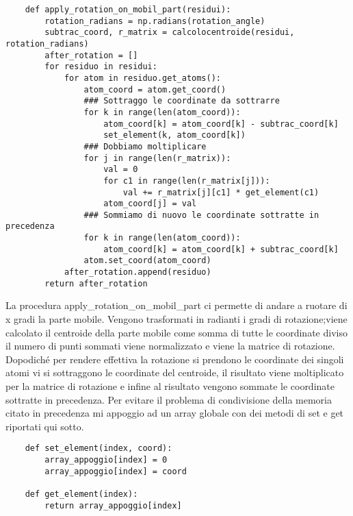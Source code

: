 \begin{verbatim}
    def apply_rotation_on_mobil_part(residui):
        rotation_radians = np.radians(rotation_angle)
        subtrac_coord, r_matrix = calcolocentroide(residui, rotation_radians)
        after_rotation = []
        for residuo in residui:
            for atom in residuo.get_atoms():
                atom_coord = atom.get_coord()
                ### Sottraggo le coordinate da sottrarre
                for k in range(len(atom_coord)):
                    atom_coord[k] = atom_coord[k] - subtrac_coord[k]
                    set_element(k, atom_coord[k])
                ### Dobbiamo moltiplicare
                for j in range(len(r_matrix)):
                    val = 0
                    for c1 in range(len(r_matrix[j])):
                        val += r_matrix[j][c1] * get_element(c1)
                    atom_coord[j] = val
                ### Sommiamo di nuovo le coordinate sottratte in precedenza
                for k in range(len(atom_coord)):
                    atom_coord[k] = atom_coord[k] + subtrac_coord[k]
                atom.set_coord(atom_coord)
            after_rotation.append(residuo)   
        return after_rotation
\end{verbatim}
La procedura apply\_rotation\_on\_mobil\_part ci permette di andare a ruotare di x gradi la parte mobile. Vengono trasformati in radianti i gradi di rotazione;viene 
calcolato il centroide della parte mobile come somma di tutte le coordinate diviso il numero di punti sommati viene normalizzato e viene la matrice di rotazione. Dopodiché
per rendere effettiva la rotazione si prendono le coordinate dei singoli atomi vi si sottraggono le coordinate del centroide, il risultato viene moltiplicato per la matrice
di rotazione e infine al risultato vengono sommate le coordinate sottratte in precedenza. Per evitare il problema di condivisione della memoria citato in precedenza mi 
appoggio ad un array globale con dei metodi di set e get riportati qui sotto. 
\begin{verbatim}
    def set_element(index, coord):
        array_appoggio[index] = 0
        array_appoggio[index] = coord

    def get_element(index):
        return array_appoggio[index]
\end{verbatim}


